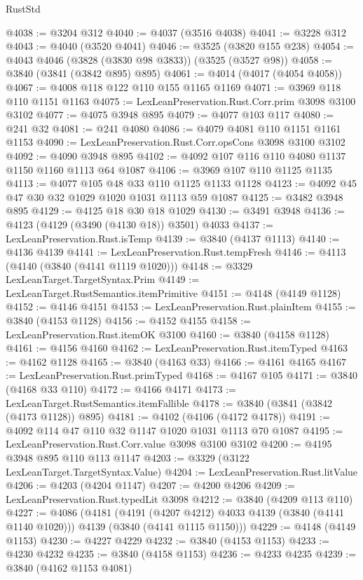 \begin{lexlean}{RustStd}
\begin{coremodule}
{\begin{coremodule}
{{{{{{{{{{{{{{{{{{{{{{{{{{@4038 := @3204 @312
@4040 := @4037 (@3516 @4038)
@4041 := @3228 @312
@4043 := @4040 (@3520 @4041)
@4046 := @3525 (@3820 @155 @238)
@4054 := @4043 @4046 (@3828 (@3830 @98 @3833)) (@3525 (@3527 @98))
@4058 := @3840 (@3841 (@3842 @895) @895)
@4061 := @4014 (@4017 (@4054 @4058))
@4067 := @4008 @118 @122 @110 @155 @1165 @1169
@4071 := @3969 @118 @110 @1151 @1163
@4075 := LexLeanPreservation.Rust.Corr.prim @3098 @3100 @3102
@4077 := @4075 @3948 @895
@4079 := @4077 @103 @117
@4080 := @241 @32
@4081 := @241 @4080
@4086 := @4079 @4081 @110 @1151 @1161 @1153
@4090 := LexLeanPreservation.Rust.Corr.opsCons @3098 @3100 @3102
@4092 := @4090 @3948 @895
@4102 := @4092 @107 @116 @110 @4080 @1137 @1150 @1160 @1113 @64 @1087
@4106 := @3969 @107 @110 @1125 @1135
@4113 := @4077 @105 @48 @33 @110 @1125 @1133 @1128
@4123 := @4092 @45 @47 @30 @32 @1029 @1020 @1031 @1113 @59 @1087
@4125 := @3482 @3948 @895
@4129 := @4125 @18 @30 @18 @1029
@4130 := @3491 @3948
@4136 := @4123 (@4129 (@3490 (@4130 @18)) @3501) @4033
@4137 := LexLeanPreservation.Rust.isTemp
@4139 := @3840 (@4137 @1113)
@4140 := @4136 @4139
@4141 := LexLeanPreservation.Rust.tempFresh
@4146 := @4113 (@4140 (@3840 (@4141 @1119 @1020)))
@4148 := @3329 LexLeanTarget.TargetSyntax.Prim
@4149 := LexLeanTarget.RustSemantics.itemPrimitive
@4151 := @4148 (@4149 @1128)
@4152 := @4146 @4151
@4153 := LexLeanPreservation.Rust.plainItem
@4155 := @3840 (@4153 @1128)
@4156 := @4152 @4155
@4158 := LexLeanPreservation.Rust.itemOK @3100
@4160 := @3840 (@4158 @1128)
@4161 := @4156 @4160
@4162 := LexLeanPreservation.Rust.itemTyped
@4163 := @4162 @1128
@4165 := @3840 (@4163 @33)
@4166 := @4161 @4165
@4167 := LexLeanPreservation.Rust.primTyped
@4168 := @4167 @105
@4171 := @3840 (@4168 @33 @110)
@4172 := @4166 @4171
@4173 := LexLeanTarget.RustSemantics.itemFallible
@4178 := @3840 (@3841 (@3842 (@4173 @1128)) @895)
@4181 := @4102 (@4106 (@4172 @4178))
@4191 := @4092 @114 @47 @110 @32 @1147 @1020 @1031 @1113 @70 @1087
@4195 := LexLeanPreservation.Rust.Corr.value @3098 @3100 @3102
@4200 := @4195 @3948 @895 @110 @113 @1147
@4203 := @3329 (@3122 LexLeanTarget.TargetSyntax.Value)
@4204 := LexLeanPreservation.Rust.litValue
@4206 := @4203 (@4204 @1147)
@4207 := @4200 @4206
@4209 := LexLeanPreservation.Rust.typedLit @3098
@4212 := @3840 (@4209 @113 @110)
@4227 := @4086
    (@4181
      (@4191 (@4207 @4212) @4033 @4139 (@3840 (@4141 @1140 @1020)))
      @4139
      (@3840 (@4141 @1115 @1150)))
@4229 := @4148 (@4149 @1153)
@4230 := @4227 @4229
@4232 := @3840 (@4153 @1153)
@4233 := @4230 @4232
@4235 := @3840 (@4158 @1153)
@4236 := @4233 @4235
@4239 := @3840 (@4162 @1153 @4081)
}}}}}}}}}}}}}}}}}}}}}}}}}}
\end{coremodule}}
\end{coremodule}
\end{lexlean}
